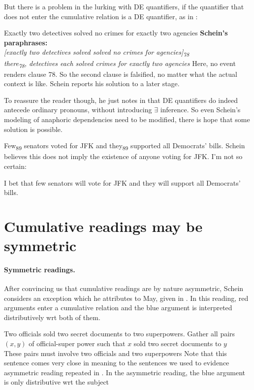 \documentclass[english]{article}
\newcommand{\fg}{\color{darkred}}
\newcommand{\bg}{\color{blueish}}
\begin{document}
\ex

\xe
%
But there is a problem in the lurking with DE quantifiers, if the quantifier that does not enter the cumulative relation is a DE quantifier, as in \cnextx:

\pex
\a 
Exactly two detectives solved no crimes for exactly two agencies
\a 
\textbf{Schein's paraphrases:}\\
\emph{[exactly two detectives solved solved no crimes for agencies]\textsubscript{78}}\\
\emph{there\textsubscript{78}, detectives each solved crimes for exactly two agencies}
\xe
%
Here, no event renders clause 78. So the second clause is falsified, no matter what the actual context is like. Schein reports his solution to a later stage.

To reassure the reader though, he just notes in \cnextx that DE quantifiers do indeed antecede ordinary pronouns, without introducing $\exists$ inference. So even Schein's modeling of anaphoric dependencies need to be modified, there is hope that some solution is possible.

\ex
Few\textsubscript{89} senators voted for JFK and they\textsubscript{89} supported all Democrats' bills.
\xe
%
Schein believes this does not imply the existence of anyone voting for JFK. I'm not so certain:

\ex
I bet that few senators will vote for JFK and they will support all Democrats' bills.
\xe
%

\section{Cumulative readings may be symmetric}

\paragraph{Symmetric readings.}
After convincing us that cumulative readings are by nature asymmetric, Schein considers an exception which he attributes to May, given in \cnextxa. In this reading, {\fg red} arguments enter a cumulative relation and the {\bg blue} argument is interpreted distributively wrt both of them.

\pex
\a 
{\fg Two officials} sold {\bg two secret documents} to {\fg two superpowers}.\label{symmetric}
\a 
Gather all pairs $(x, y)$ of official-super power such that $x$ sold two secret documents to $y$\\
These pairs must involve two officials and two superpowers
\xe
%
Note that this sentence comes very close in meaning to the sentences we used to evidence asymmetric reading repeated in \cnextx. In the asymmetric reading, the {\bg blue} argument is only distributive wrt the subject
\end{document}
